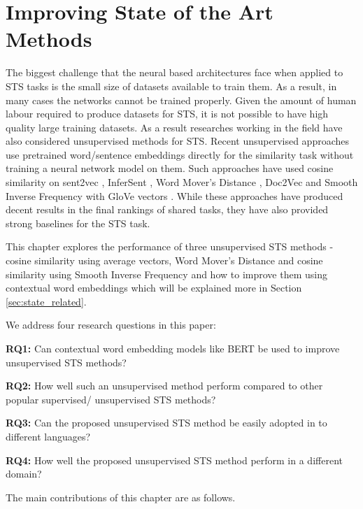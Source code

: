 \chapter{\label{cha:sts_state_of_the_art_methods}Improving State of the Art Methods}

The biggest challenge that the neural based architectures face when applied to STS tasks is the small size of datasets available to train them. As a result, in many cases the networks cannot be trained properly. Given the amount of human labour required to produce datasets for STS, it is not possible to have high quality large training datasets. As a result researches working in the field have also considered unsupervised methods for STS. Recent unsupervised approaches use pretrained word/sentence embeddings directly for the similarity task without training a neural network model on them. Such approaches have used cosine similarity on sent2vec \cite{pagliardini-etal-2018-unsupervised}, InferSent \cite{conneau-EtAl:2017:EMNLP2017}, Word Mover's Distance \cite{10.5555/3045118.3045221}, Doc2Vec \cite{10.5555/3044805.3045025} and Smooth Inverse Frequency with GloVe vectors \cite{DBLP:conf/iclr/AroraLM17}. While these approaches have produced decent results in the final rankings of shared tasks, they have also provided strong baselines for the STS task. 

This chapter explores the performance of three unsupervised STS methods - cosine similarity using average vectors, Word Mover's Distance \cite{10.5555/3045118.3045221} and cosine similarity using Smooth Inverse Frequency \cite{DBLP:conf/iclr/AroraLM17} and how to improve them using contextual word embeddings which will be explained more in Section \ref{sec:state_related}. 

We address four research questions in this paper:

\textbf{RQ1:} Can contextual word embedding models like BERT be used to improve unsupervised STS methods?

\textbf{RQ2:} How well such an unsupervised method perform compared to other popular supervised/ unsupervised STS methods?

\textbf{RQ3:} Can the proposed unsupervised STS method be easily adopted in to different languages?

\textbf{RQ4:} How well the proposed unsupervised STS method perform in a different domain? 


The main contributions of this chapter are as follows.

